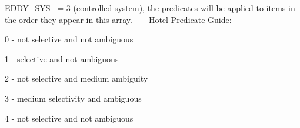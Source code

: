\mbox{\hyperlink{namespacedynamicfilterapp_1_1toggles_a549d2c90f3f5922ad1442df2113fca1b}{E\+D\+D\+Y\+\_\+\+S\+YS }} = 3 (controlled system), the predicates will be applied to items in the order they appear in this array. ~\newline
~\newline
Hotel Predicate Guide\+:
\begin{DoxyItemize}
\item 0 -\/ not selective and not ambiguous
\item 1 -\/ selective and not ambiguous
\item 2 -\/ not selective and medium ambiguity
\item 3 -\/ medium selectivity and ambiguous
\item 4 -\/ not selective and not ambiguous
\end{DoxyItemize}


